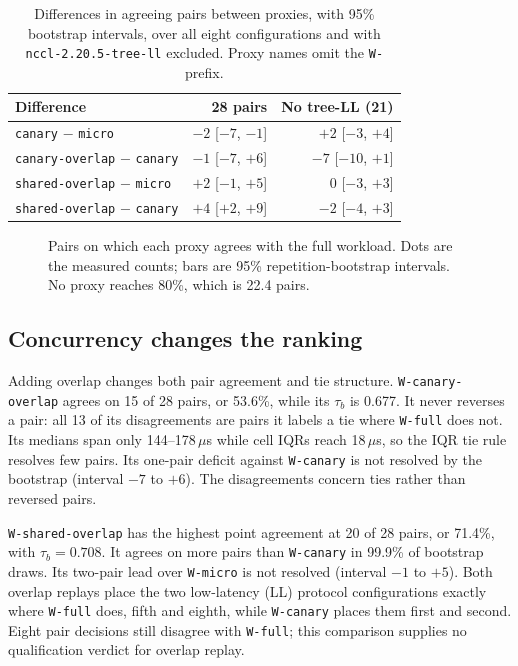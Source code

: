 \documentclass[10pt,twocolumn]{article}
\newcommand{\wname}[1]{\texttt{W-#1}}
\begin{document}
\begin{table}[t]
\caption{Differences in agreeing pairs between proxies, with 95\% bootstrap
intervals, over all eight configurations and with
\texttt{nccl-2.20.5-tree-ll} excluded. Proxy names omit the \texttt{W-} prefix.}
\label{tab:sensitivity}
\centering\footnotesize
\setlength{\tabcolsep}{4pt}
\begin{tabular}{@{}lrr@{}}
\toprule
Difference & 28 pairs & No tree-LL (21) \\
\midrule
\texttt{canary} $-$ \texttt{micro} & $-2$ [$-7$, $-1$] & $+2$ [$-3$, $+4$] \\
\texttt{canary-overlap} $-$ \texttt{canary} & $-1$ [$-7$, $+6$] & $-7$ [$-10$, $+1$] \\
\texttt{shared-overlap} $-$ \texttt{micro} & $+2$ [$-1$, $+5$] & $0$ [$-3$, $+3$] \\
\texttt{shared-overlap} $-$ \texttt{canary} & $+4$ [$+2$, $+9$] & $-2$ [$-4$, $+3$] \\
\bottomrule
\end{tabular}
\end{table}

\begin{figure}[t]
  \centering
  
  \caption{Pairs on which each proxy agrees with the full workload. Dots are
  the measured counts; bars are 95\% repetition-bootstrap intervals. No proxy
  reaches 80\%, which is 22.4 pairs.}
  \label{fig:agreement}
\end{figure}

\subsection{Concurrency changes the ranking}

Adding overlap changes both pair agreement and tie structure.
\wname{canary-overlap} agrees on 15 of 28 pairs, or 53.6\%, while its
$\tau_b$ is 0.677. It never reverses a pair: all 13 of its disagreements are
pairs it labels a tie where \wname{full} does not. Its medians span only
144--178\,$\mu$s while cell IQRs reach 18\,$\mu$s, so the IQR tie rule
resolves few pairs. Its one-pair deficit against \wname{canary} is not resolved
by the bootstrap (interval $-7$ to $+6$). The disagreements concern ties rather
than reversed pairs.

\wname{shared-overlap} has the highest point agreement at 20 of 28 pairs,
or 71.4\%, with $\tau_b=0.708$. It agrees on more pairs than \wname{canary} in
99.9\% of bootstrap draws. Its two-pair lead over \wname{micro} is not resolved
(interval $-1$ to $+5$). Both overlap replays place the two low-latency (LL)
protocol configurations exactly where \wname{full} does, fifth and eighth,
while \wname{canary} places them first and second. Eight pair decisions still
disagree with \wname{full}; this comparison supplies no qualification verdict
for overlap replay.
\end{document}
